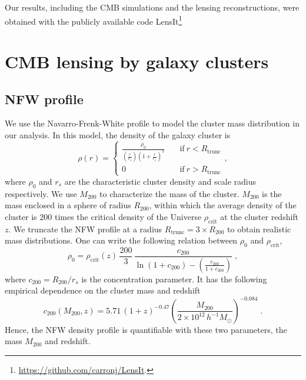 \documentclass[prd, superscriptaddress, tightenlines, longbibliography, nofootinbib, eqsecnum, amsfonts, amsmath, floatfix, twocolumn, notitlepage]{revtex4-2}
\begin{document}
Our results, including the CMB simulations and the lensing reconstructions, were obtained with the publicly available code LensIt\footnote[1]{\url{https://github.com/carronj/LensIt}.}


\section{CMB lensing by galaxy clusters}
\label{sec:model}

\subsection{NFW profile}

We use the Navarro-Frenk-White profile \cite[NFW,][]{Navarro:1995iw} to model the cluster mass distribution in our analysis. In this model, the density of the galaxy cluster is
\begin{equation}\label{eq:NFW}
    \rho(r) = \begin{cases} \displaystyle 
               \frac{\rho_0}{(\frac{r}{r_s})(1+\frac{r}{r_s})^2} &\quad \text{if} \ r < R_{\text{trunc}} \\
               0  &\quad \text{if} \ r > R_{\text{trunc}}
               \end{cases},
\end{equation}
where $\rho_0$ and $r_s$ are the characteristic cluster density and scale radius respectively. 
We use $M_{200}$ to characterize the mass of the cluster. $M_{200}$ is the mass enclosed in a sphere of radius $R_{200}$, within which the average density of the cluster is $200$ times the critical density of the Universe $\rho_{\text{crit}}$ at the cluster redshift $z$.
We truncate the NFW profile at a radius $R_{\text{trunc}} = 3\times R_{200}$ to obtain realistic mass distributions.
One can write the following relation between $\rho_0$ and $\rho_{\text{crit}}$,
\begin{equation}\label{eq:rho_0}
    \rho_0 = \rho_{\text{crit}}(z) \,  \frac{200}{3} \,  \frac{c_{200}}{ \displaystyle \ln{(1+c_{200})}-\left(\frac{c_{200}}{1+c_{200}}\right)} \; ,
\end{equation}
where $c_{200} = R_{200}/r_s$ is the concentration parameter. It has the following empirical dependence on the cluster mass and redshift \cite{Duffy:2008pz, Geach:2017crt}
\begin{equation}\label{eq:c200}
    c_{200}(M_{200}, z) = 5.71 \, (1+z)^{-0.47} \left(\frac{M_{200}}{2\times10^{12} \, h^{-1}M_{\odot}}\right)^{-0.084} \; .
\end{equation}
Hence, the NFW density profile is quantifiable with these two parameters, the mass $M_{200}$ and redshift.
\end{document}
